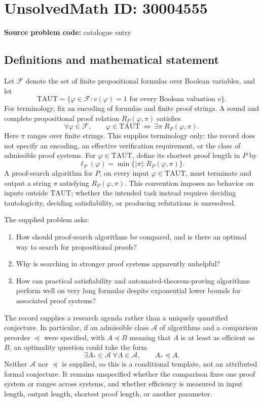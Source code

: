 \documentclass[11pt]{article}
\begin{document}
\section*{UnsolvedMath ID: 30004555}
\textbf{Source problem code:} catalogue entry
\subsection{Definitions and mathematical statement}
Let \(\mathcal F\) denote the set of finite propositional formulas over Boolean variables, and let
\[
\mathrm{TAUT}=\{\varphi\in\mathcal F: v(\varphi)=1\text{ for every Boolean valuation }v\}.
\]
For terminology, fix an encoding of formulas and finite proof strings. A sound and complete propositional proof relation \(R_P(\varphi,\pi)\) satisfies
\[
\forall\varphi\in\mathcal F,\qquad
\varphi\in\mathrm{TAUT}\ \Longleftrightarrow\ \exists\pi\;R_P(\varphi,\pi).
\]
Here \(\pi\) ranges over finite strings. This supplies terminology only: the record does not specify an encoding, an effective verification requirement, or the class of admissible proof systems. For \(\varphi\in\mathrm{TAUT}\), define its shortest proof length in \(P\) by
\[
\ell_P(\varphi)=\min\{\lvert\pi\rvert:R_P(\varphi,\pi)\}.
\]
A proof-search algorithm for \(P\), on every input \(\varphi\in\mathrm{TAUT}\), must terminate and output a string \(\pi\) satisfying \(R_P(\varphi,\pi)\). This convention imposes no behavior on inputs outside \(\mathrm{TAUT}\); whether the intended task instead requires deciding tautologicity, deciding satisfiability, or producing refutations is unresolved.

The supplied problem asks:
\begin{enumerate}
\item How should proof-search algorithms be compared, and is there an optimal way to search for propositional proofs?
\item Why is searching in stronger proof systems apparently unhelpful?
\item How can practical satisfiability and automated-theorem-proving algorithms perform well on very long formulas despite exponential lower bounds for associated proof systems?
\end{enumerate}

The record supplies a research agenda rather than a uniquely quantified conjecture. In particular, if an admissible class \(\mathcal A\) of algorithms and a comparison preorder \(\preceq\) were specified, with \(A\preceq B\) meaning that \(A\) is at least as efficient as \(B\), an optimality question could take the form
\[
\exists A_*\in\mathcal A\;\forall A\in\mathcal A,\qquad A_*\preceq A.
\]
Neither \(\mathcal A\) nor \(\preceq\) is supplied, so this is a conditional template, not an attributed formal conjecture. It remains unspecified whether the comparison fixes one proof system or ranges across systems, and whether efficiency is measured in input length, output length, shortest proof length, or another parameter.
\end{document}
